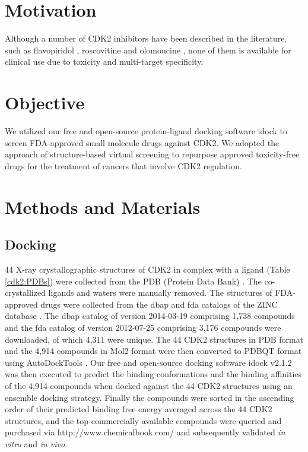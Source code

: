 \section{Motivation}

Although a number of CDK2 inhibitors have been described in the literature, such as flavopiridol \citep{1596}, roscovitine \citep{1597} and olomoucine \citep{1598}, none of them is available for clinical use due to toxicity and multi-target specificity.

\section{Objective}

We utilized our free and open-source protein-ligand docking software idock \citep{1153,1362} to screen FDA-approved small molecule drugs against CDK2. We adopted the approach of structure-based virtual screening to repurpose approved toxicity-free drugs for the treatment of cancers that involve CDK2 regulation.

\section{Methods and Materials}

\subsection{Docking}

44 X-ray crystallographic structures of CDK2 in complex with a ligand (Table \ref{cdk2:PDBs}) were collected from the PDB (Protein Data Bank) \citep{540,537}. The co-crystallized ligands and waters were manually removed. The structures of FDA-approved drugs were collected from the dbap and fda catalogs of the ZINC database \citep{532,1178}. The dbap catalog of version 2014-03-19 comprising 1,738 compounds and the fda catalog of version 2012-07-25 comprising 3,176 compounds were downloaded, of which 4,311 were unique. The 44 CDK2 structures in PDB format and the 4,914 compounds in Mol2 format were then converted to PDBQT format using AutoDockTools \citep{596}. Our free and open-source docking software idock v2.1.2 \citep{1153,1362} was then executed to predict the binding conformations and the binding affinities of the 4,914 compounds when docked against the 44 CDK2 structures using an ensemble docking strategy. Finally the compounds were sorted in the ascending order of their predicted binding free energy averaged across the 44 CDK2 structures, and the top commercially available compounds were queried and purchased via http://www.chemicalbook.com/ and subsequently validated \textit{in vitro} and \textit{in vivo}.

